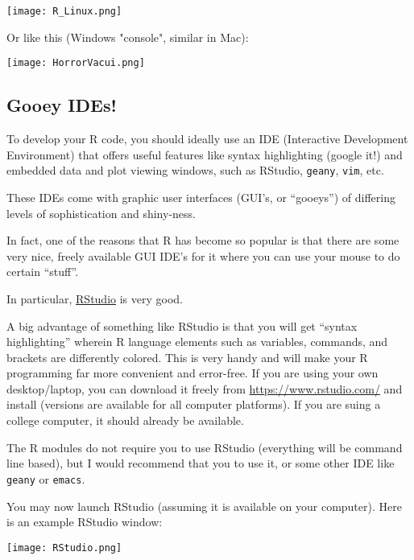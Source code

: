 \begin{center}
	\texttt{[image: R\_Linux.png]}
\end{center}

Or like this (Windows "console", similar in Mac):
 
\begin{center}
	\texttt{[image: HorrorVacui.png]}
\end{center}

\subsection{Gooey IDEs!}

To develop your R code, you should ideally use an IDE (Interactive 
Development Environment) that offers useful features like syntax  
highlighting (google it!) and embedded data and plot viewing windows, 
such as RStudio, {\tt geany}, {\tt vim}, etc. 

These IDEs come with graphic user interfaces (GUI's, or ``gooeys'') of 
differing levels of sophistication and shiny-ness.

In fact, one of the reasons that R has become so popular is that there 
are some very nice, freely available GUI IDE's for it where you can 
use your mouse to do certain ``stuff''. 

In particular, \href{http://rstudio.org/}{RStudio} is very good. 

A big advantage of something like RStudio is that you will get ``syntax 
highlighting'' wherein R language elements such as variables, commands, 
and brackets are differently colored. This is very handy and will make 
your R programming far more convenient and error-free. If you are using 
your own desktop/laptop, you can download it freely from 
\url{https://www.rstudio.com/} and install (versions are available for all 
computer platforms). If you are suing a college computer, it should 
already be available.

The R modules do not require you to use RStudio (everything will 
be command line based), but I would recommend that you to use it, or 
some other IDE like {\tt geany} or {\tt emacs}. 

You may now launch RStudio (assuming it is available on your computer). 
Here is an example RStudio window: 
\begin{center}
	\texttt{[image: RStudio.png]}
\end{center}

